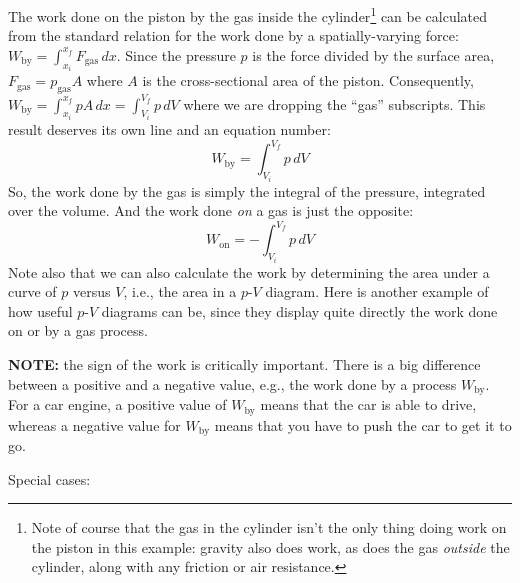 The work done on the piston by the gas inside the
cylinder\footnote{Note of course that the gas in the cylinder isn't the only
  thing doing work on the piston in this example: gravity also does
  work, as does the gas {\em outside} the cylinder, along with any
  friction or air resistance.}  can be calculated from the standard
relation for the work done by a spatially-varying force:
$W_\text{by}=\int_{x_i}^{x_f}{F_\text{gas}\,dx}$.  Since the pressure $p$ is the
force divided by the surface area, $F_\text{gas} = p_\text{gas}A$
where $A$ is the cross-sectional area of the piston.  Consequently,
$W_\text{by} = \int_{x_i}^{x_f}{pA\,dx} = \int_{V_i}^{V_f}{p\,dV}$ where we are dropping the
``gas'' subscripts. This result deserves its own line and an equation
number:
\begin{equation}
W_\text{by} = \int_{V_i}^{V_f} p\,dV
\label{eq:WorkBy}
\end{equation}
So, the work done by the gas is simply the integral of the pressure,
integrated over the volume.  And the work done {\em on} a gas is just the
opposite:  
\begin{equation}
W_\text{on} = -\int_{V_i}^{V_f} p\,dV
\label{eq:WorkOn}
\end{equation}
Note also that we can also calculate the work
by determining the area under a curve of $p$ versus $V$, i.e., the area in a
$p$-$V$ diagram.  Here is another example of how useful $p$-$V$ diagrams can be,
since they display quite directly the work done on or by a gas process.


{\bf NOTE:} the sign of the work is critically important.  There is a big
difference between a positive and a negative value, e.g., the work
done by a process $W_\text{by}$. For a car engine, a positive
value of $W_\text{by}$ means that the car is able to drive, whereas a negative
value for $W_\text{by}$ means that you have to push the car to get it to go.

Special cases:

